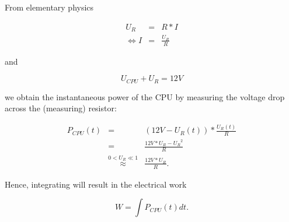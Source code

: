 \label{sec:calc-work}

From elementary physics

\begin{eqnarray}
     U_R & = & R * I \\
  \iff I & = & \frac{U_R}{R}
\end{eqnarray}

and

\begin{equation}
  U_{CPU} + U_{R} = 12 V
\end{equation}

we obtain the instantaneous power of the CPU by measuring the voltage drop
across the (measuring) resistor:

\begin{eqnarray}
P_{CPU}(t) & = & (12V - U_R(t)) * \frac{U_R(t)}{R} \\
           & = & \frac{12V * U_R - {U_R}^2}{R} \\
           & \stackrel{0 < U_R \ll 1}{\approx} & \frac{12V * U_R}{R}.
\end{eqnarray}

Hence, integrating will result in the electrical work

\begin{equation}
  W = \int P_{CPU}(t)dt.
\end{equation}

